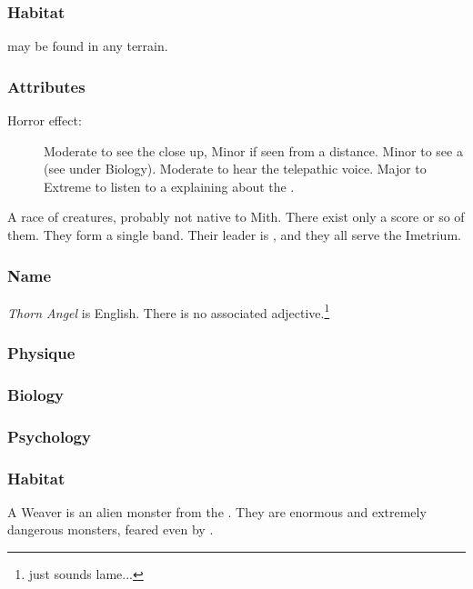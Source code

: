 \subsubsection{Habitat}
\Banes{} may be found in any terrain. 

\subsubsection{Attributes}
\begin{description}
	\item[Horror effect:] Moderate to see the \bane{} close up, Minor if seen from a distance. Minor to see a \bane{}  (see under Biology). Moderate to hear the \banez{} telepathic voice. Major to Extreme to listen to a \bane{} explaining about the \baneworld. 
\end{description}



A race of creatures, probably not native to Mith. There exist only a score or so of them. They form a single band. Their leader is \Hiothrex{}, and they all serve the Imetrium. 

\subsubsection{Name}
\emph{Thorn Angel} is English. There is no associated adjective.\footnote{ just sounds lame...} 

\subsubsection{Physique}
\subsubsection{Biology}
\subsubsection{Psychology}
\subsubsection{Habitat}




A Weaver is an alien monster from the \baneworld. They are enormous and extremely dangerous monsters, feared even by \dragons{}. 


